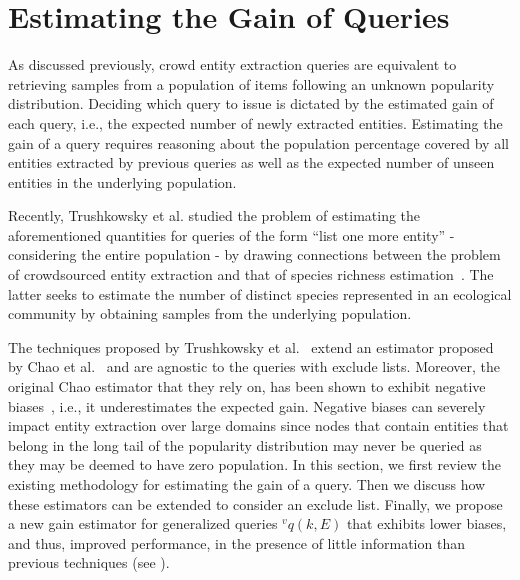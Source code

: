 
\section{Estimating the Gain of Queries}
\label{sec:gainestimators}
As discussed previously, crowd entity extraction queries are equivalent to retrieving samples from a population of items following an unknown popularity distribution. Deciding which query to issue is dictated by the estimated gain of each query, i.e., the expected number of newly extracted entities. Estimating the gain of a query requires reasoning about the population percentage covered by all entities extracted by previous queries as well as the expected number of unseen entities in the underlying population.

Recently, Trushkowsky et al. studied the problem of estimating the aforementioned quantities for queries of the form ``list one more entity'' - considering the entire population -  by drawing connections between the problem of crowdsourced entity extraction and that of species richness estimation~\cite{chao:1992}. The latter seeks to estimate the number of distinct species represented in an ecological community by obtaining samples from the underlying population. 

The techniques proposed by Trushkowsky et al.~\cite{trushkowsky:2013} extend an estimator proposed by Chao et al.~\cite{chao:1992} and are agnostic to the queries with exclude lists. Moreover, the original Chao estimator that they rely on, has been shown to exhibit negative biases~\cite{hwang:2010, shen:2003}, i.e., it underestimates the expected gain. Negative biases can severely impact entity extraction over large domains since nodes that contain entities that belong in the long tail of the popularity distribution may never be queried as they may be deemed to have zero population. In this section, we first review the existing methodology for estimating the gain of a query. Then we discuss how these estimators can be extended to consider an exclude list. Finally, we propose a new gain estimator for generalized queries $^vq(k,E)$ that exhibits lower biases, and thus, improved performance, in the presence of little information than previous techniques (see ).

